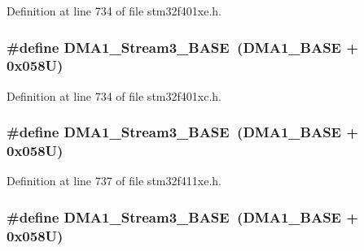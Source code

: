Definition at line 734 of file stm32f401xe.\+h.

\subsubsection[{\texorpdfstring{D\+M\+A1\+\_\+\+Stream3\+\_\+\+B\+A\+SE}{DMA1_Stream3_BASE}}]{\setlength{\rightskip}{0pt plus 5cm}\#define D\+M\+A1\+\_\+\+Stream3\+\_\+\+B\+A\+SE~({\bf D\+M\+A1\+\_\+\+B\+A\+SE} + 0x058\+U)}\hypertarget{group___peripheral__registers__structures_gac51deb54ff7cfe1290dfcf517ae67127}{}\label{group___peripheral__registers__structures_gac51deb54ff7cfe1290dfcf517ae67127}


Definition at line 734 of file stm32f401xc.\+h.

\subsubsection[{\texorpdfstring{D\+M\+A1\+\_\+\+Stream3\+\_\+\+B\+A\+SE}{DMA1_Stream3_BASE}}]{\setlength{\rightskip}{0pt plus 5cm}\#define D\+M\+A1\+\_\+\+Stream3\+\_\+\+B\+A\+SE~({\bf D\+M\+A1\+\_\+\+B\+A\+SE} + 0x058\+U)}\hypertarget{group___peripheral__registers__structures_gac51deb54ff7cfe1290dfcf517ae67127}{}\label{group___peripheral__registers__structures_gac51deb54ff7cfe1290dfcf517ae67127}


Definition at line 737 of file stm32f411xe.\+h.

\subsubsection[{\texorpdfstring{D\+M\+A1\+\_\+\+Stream3\+\_\+\+B\+A\+SE}{DMA1_Stream3_BASE}}]{\setlength{\rightskip}{0pt plus 5cm}\#define D\+M\+A1\+\_\+\+Stream3\+\_\+\+B\+A\+SE~({\bf D\+M\+A1\+\_\+\+B\+A\+SE} + 0x058\+U)}\hypertarget{group___peripheral__registers__structures_gac51deb54ff7cfe1290dfcf517ae67127}{}\label{group___peripheral__registers__structures_gac51deb54ff7cfe1290dfcf517ae67127}


